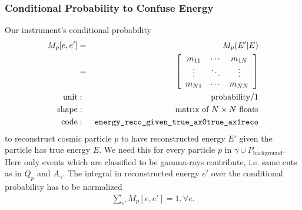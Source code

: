\documentclass{article}%
\begin{document}
\subsubsection*{Conditional Probability to Confuse Energy}
%
Our instrument's conditional probability
%
\begin{eqnarray*}
M_p[e, e'] &=& M_p(E' \vert E)\\
&=&
  \left[ {\begin{array}{ccc}
    m_{11} & \cdots & m_{1N}\\
    \vdots & \ddots & \vdots\\
    m_{N1} & \cdots & m_{NN}\\
  \end{array} } \right]\\
\text{unit} &:& \text{probability}/1\\
\text{shape} &:& \text{matrix of}\,\,N \times N \,\,\text{floats}\\
\text{code} &:& \verb|energy_reco_given_true_ax0true_ax1reco|
\end{eqnarray*}
%
to reconstruct cosmic particle $p$ to have reconstructed energy $E'$ given the particle has true energy $E$.
%
We need this for every particle $p$ in $\gamma \cup P_\text{background}$.
%
Here only events which are classified to be gamma-rays contribute, i.e. same cuts as in $Q_p$ and $A_\gamma$.
%
The integral in reconstructed energy $e'$ over the conditional probability has to be normalized
%
\begin{eqnarray*}
\sum_{e'} M_p[e, e'] = 1, \forall e.
\end{eqnarray*}
%
\end{document}
